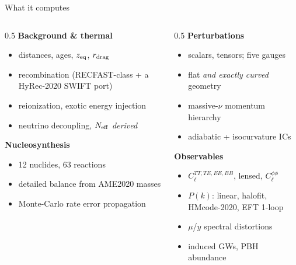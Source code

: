 \documentclass[10pt,aspectratio=43]{beamer}
\newcommand{\cl}{C_\ell}
\begin{document}
\begin{frame}{What it computes}
  \begin{columns}[T]
    \begin{column}{0.5\textwidth}
      \textbf{Background \& thermal}
      \begin{itemize}\small
        \item distances, ages, $z_{\rm eq}$, $r_{\rm drag}$
        \item recombination (RECFAST-class + a HyRec-2020 SWIFT port)
        \item reionization, exotic energy injection
        \item neutrino decoupling, $N_{\rm eff}$ \emph{derived}
      \end{itemize}
      \vspace{1ex}
      \textbf{Nucleosynthesis}
      \begin{itemize}\small
        \item 12 nuclides, 63 reactions
        \item detailed balance from AME2020 masses
        \item Monte-Carlo rate error propagation
      \end{itemize}
    \end{column}
    \begin{column}{0.5\textwidth}
      \textbf{Perturbations}
      \begin{itemize}\small
        \item scalars, tensors; five gauges
        \item flat \emph{and exactly curved} geometry
        \item massive-$\nu$ momentum hierarchy
        \item adiabatic + isocurvature ICs
      \end{itemize}
      \vspace{1ex}
      \textbf{Observables}
      \begin{itemize}\small
        \item $\cl^{TT,TE,EE,BB}$, lensed, $\cl^{\phi\phi}$
        \item $P(k)$: linear, halofit, HMcode-2020, EFT 1-loop
        \item $\mu$/$y$ spectral distortions
        \item induced GWs, PBH abundance
      \end{itemize}
    \end{column}
  \end{columns}
\end{frame}
\end{document}
